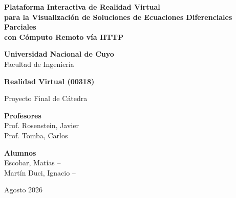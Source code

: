 \documentclass[12pt, a4paper]{article}
\begin{document}
\thispagestyle{empty}

\begin{center}

    \vspace*{1.5cm}

    {\large\bfseries
        Plataforma Interactiva de Realidad Virtual\\[5pt]
        para la Visualización de Soluciones de Ecuaciones Diferenciales Parciales\\[5pt]
        con Cómputo Remoto vía HTTP
    }

    \vspace{1.8cm}

    {\LARGE\bfseries\color{azulUNC} Universidad Nacional de Cuyo}\\[6pt]
    {\large Facultad de Ingeniería}

    \vspace{3cm}

    {\large\color{verdeRV}\bfseries Realidad Virtual (00318)}

    \vspace{0.4cm}

    {\normalsize Proyecto Final de Cátedra}

    \vspace{3cm}

    {\normalsize\bfseries Profesores}\\[6pt]
    {\normalsize\color{azulUNC}
        Prof. Rosenstein, Javier \\[4pt]
        Prof. Tomba, Carlos
    }

    \vspace{1.2cm}

    {\normalsize\bfseries Alumnos}\\[6pt]
    {\normalsize\color{azulUNC}
        Escobar, Matías \quad --  \\[4pt]
        Martín Duci, Ignacio \quad -- 
    }

    \vspace{1.2cm}

    {\normalsize Agosto 2026}
\end{center}

\newpage
\thispagestyle{fancy}
\tableofcontents

\newpage
\thispagestyle{fancy}
\end{document}
